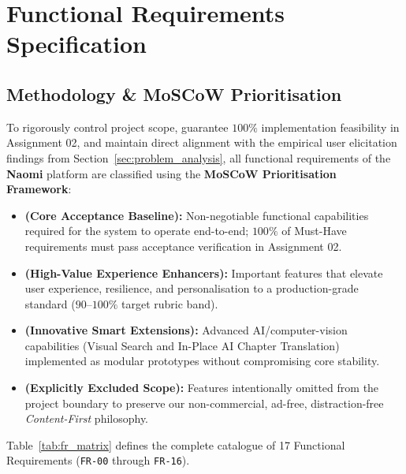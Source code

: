 \section{Functional Requirements Specification}
\label{sec:functional_requirements}

\subsection{Methodology \& MoSCoW Prioritisation}
\label{subsec:moscow}

To rigorously control project scope, guarantee $100\%$ implementation feasibility in Assignment 02, and maintain direct alignment with the empirical user elicitation findings from Section~\ref{sec:problem_analysis}, all functional requirements of the \textbf{Naomi} platform are classified using the \textbf{MoSCoW Prioritisation Framework}:
\begin{itemize}
    \item \badgeMust{} \textbf{(Core Acceptance Baseline):} Non-negotiable functional capabilities required for the system to operate end-to-end; $100\%$ of Must-Have requirements must pass acceptance verification in Assignment 02.
    \item \badgeShould{} \textbf{(High-Value Experience Enhancers):} Important features that elevate user experience, resilience, and personalisation to a production-grade standard ($90\text{--}100\%$ target rubric band).
    \item \badgeCould{} \textbf{(Innovative Smart Extensions):} Advanced AI/computer-vision capabilities (Visual Search and In-Place AI Chapter Translation) implemented as modular prototypes without compromising core stability.
    \item \badgeWont{} \textbf{(Explicitly Excluded Scope):} Features intentionally omitted from the project boundary to preserve our non-commercial, ad-free, distraction-free \textit{Content-First} philosophy.
\end{itemize}

Table~\ref{tab:fr_matrix} defines the complete catalogue of 17 Functional Requirements (\texttt{FR-00} through \texttt{FR-16}).

